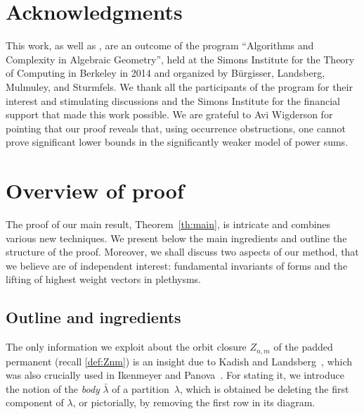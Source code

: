\documentclass[11pt]{amsart}
\def\la{\lambda}
\def\ocp{Z}
\numberwithin{equation}{section}
\begin{document}
\section*{Acknowledgments}
{\footnotesize
This work, as well as \cite{ik-panova:15}, are an outcome of the program ``Algorithms and Complexity in Algebraic Geometry'', 
held at the Simons Institute for the Theory of Computing in Berkeley in 2014 and organized by B\"urgisser, Landsberg, Mulmuley, and Sturmfels.
We thank all the participants of the program for their interest and stimulating discussions and the Simons Institute for the financial support that 
made this work possible. 
We are grateful to Avi Wigderson for pointing that our proof reveals that, using occurrence obstructions, 
one cannot prove significant lower bounds in the significantly weaker model of power sums. 
}

\section{Overview of proof}\label{se:outline}

The proof of our main result, Theorem~\ref{th:main}, 
is intricate and combines various new techniques. 
We present below the main ingredients and outline the structure of the proof. 
Moreover, we shall discuss two aspects of our method, that we believe 
are of independent interest: fundamental invariants of forms and the lifting of 
highest weight vectors in plethysms.

\subsection{Outline and ingredients}

The only information we exploit about the orbit closure $\ocp_{n,m}$ of the padded permanent
(recall \eqref{def:Znm}) is an insight due to Kadish and Landsberg~\cite{kadish-landsberg:14}, which 
was also crucially used in Ikenmeyer and Panova~\cite{ik-panova:15}. 
For stating it, we introduce the notion of the {\em body} $\bar\la$ of a partition~$\la$, which 
is obtained be deleting the first component of $\la$, or pictorially, by removing the first row in its diagram. 
\end{document}
